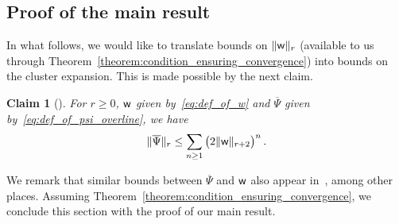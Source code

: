 \documentclass[11pt]{article}
\newtheorem{claim}[theorem]{Claim}
\theoremstyle{definition}
\theoremstyle{remark}
\numberwithin{theorem}{section}
\begin{document}
    \subsection{Proof of the main result}
    In what follows, we would like to translate bounds on $\|{\sf w} \|_r$ (available to us through Theorem~\ref{theorem:condition_ensuring_convergence}) into bounds on the cluster expansion. This is made possible by the next claim. 
     \begin{claim}[{\cite[Appendix~A.2]{Balaban-Imbrie-Jaffe-Brydges}}]
        \label{claim:bound_of_norm_of_psi_by_norm_of_w}
        For $r\ge 0$, ${\sf w}$ given by~\eqref{eq:def_of_w} and $\overline \Psi$ given by~\eqref{eq:def_of_psi_overline}, we have
        \[
        \| \overline{\Psi} \|_r \le \sum_{n\ge 1}  \big(2 \| {\sf w} \|_{r+2}\big)^n \, .
        \]
    \end{claim}
    \noindent 
    We remark that similar bounds between $\overline\Psi$ and ${\sf w}$ also appear in~\cite{Cammarota, Kotecky-Preiss}, among other places. Assuming Theorem~\ref{theorem:condition_ensuring_convergence}, we conclude this section with the proof of our main result. 
\end{document}
